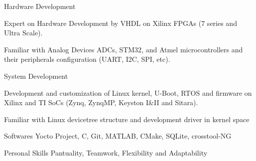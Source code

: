 


\begin{cvskills}


\cvskill
{Hardware Development} %
{
\item Expert on Hardware Development by VHDL on Xilinx FPGAs (7 series and Ultra Scale).
\item Familiar with Analog Devices ADCs, STM32, and Atmel microcontrollers and their peripherals configuration (UART, I2C, SPI, etc).
}


\cvskill
{System Development} %
{
\item Development and customization of Linux kernel, U-Boot, RTOS and firmware on Xilinx and TI SoCs (Zynq, ZynqMP, Keyston I\&II and Sitara).
\item Familiar with Linux devicetree structure and development driver in kernel space
}


\cvskill
{Softwares} %
{Yocto Project, C, Git, MATLAB, CMake, SQLite, crosstool-NG}


\cvskill
{Personal Skills} %
{Pantuality, Teamwork, Flexibility and Adaptability} %




\end{cvskills}
